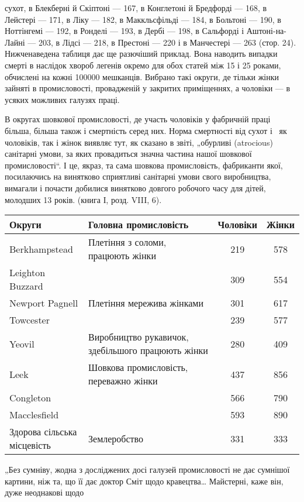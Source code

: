 \parcont{}  %
сухот, в Блекберні й Скіптоні — 167, в Конглетоні й Бредфорді —
168, в Лейстері — 171, в Ліку — 182, в Маккльсфільді — 184,
в Больтоні — 190, в Ноттінгемі — 192, в Ронделі — 193, в Дербі —
198, в Сальфорді і Аштоні-на-Лайні — 203, в Лідсі — 218, в Престоні — 220 і в Манчестері — 263
(стор. 24). Нижченаведена таблиця дає ще разючіший приклад. Вона наводить випадки смерті
в наслідок хвороб легенів окремо для обох статей між 15 і
25 роками, обчислені на кожні \num{100000} мешканців. Вибрано такі
округи, де тільки жінки зайняті в промисловості, провадженій
у закритих приміщеннях, а чоловіки — в усяких можливих галузях праці.

В округах шовкової промисловості, де участь чоловіків
у фабричній праці більша, більша також і смертність серед них.
Норма смертності від сухот і~ як чоловіків, так і жінок
виявляє тут, як сказано в звіті, „обурливі (atrocious) санітарні
умови, за яких провадиться значна частина нашої шовкової
промисловості“. І це, якраз, та сама шовкова промисловість,
фабриканти якої, посилаючись на винятково сприятливі санітарні умови свого виробництва, вимагали і
почасти добилися
винятково довгого робочого часу для дітей, молодших 13 років.
(книга І, розд. VIII, 6).

\begin{table}[H]
	\centering
	\small
	\begin{tabular}{l l c c}
		\toprule
		Округи &
		Головна промисловість &
		Чоловіки & Жінки \\
		\midrule
		
		Berkhampstead    & Плетіння з соломи, працюють жінки & 219 & 578 \\
		Leighton Buzzard  &                                       & 309 & 554 \\
		Newport Pagnell  & Плетіння мережива жінками         & 301 & 617 \\
		Towcester        &                                        & 239 & 577 \\
		Yeovil           & \makecell[lb]{Виробництво рукавичок,\\здебільшого працюють жінки} & 280 & 409 \\
		Leek             & \makecell[lb]{Шовкова промисловість, \\ переважно жінки} & 437 & 856 \\
		Congleton        &                                             & 566 & 790 \\
		Macclesfield     &                                             & 593 & 890 \\
		\makecell[lb]{Здорова сільська \\ місцевість} &   Землеробство                         & 331 & 333 \\
	\end{tabular}
\end{table}

\noindent{}„Без сумніву, жодна з досліджених досі галузей промисловості
не дає сумнішої картини, ніж та, що її дає доктор Сміт
щодо кравецтва\dots{} Майстерні, каже він, дуже неоднакові щодо
\parbreak{}  %

